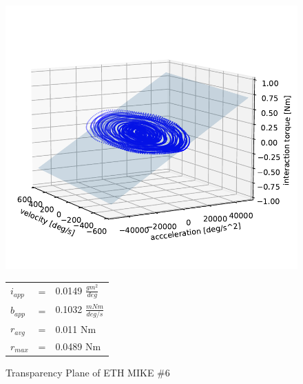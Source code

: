 \begin{figure}[h]
    \begin{minipage}[m]{0.8\textwidth}
     \centering
        \includegraphics[width = \textwidth]{chapters/transparency/Mike6_Transparency.pdf}
    \end{minipage}
    \hfill
\begin{minipage}[m]{0.15\textwidth}
    \centering
    \begin{tabular}{lll}
        $i_{app}$ & = & 0.0149 $\frac{gm^2}{deg}$ \\ 
        $b_{app}$  & = & 0.1032 $\frac{mNm}{deg/s}$  \\ 
        $r_{avg}$  & = & 0.011 Nm \\
        $r_{max}$  & = & 0.0489 Nm \\ 
    \end{tabular}
\end{minipage}
\caption{Transparency Plane of ETH MIKE \#6}
\end{figure}

